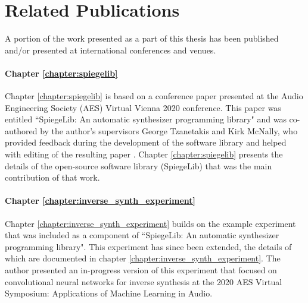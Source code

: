 \newpage
{}

\chapter*{Related Publications}

A portion of the work presented as a part of this thesis has been published and/or presented at international conferences and venues. 

\subsubsection{Chapter \ref{chapter:spiegelib}}
Chapter \ref{chapter:spiegelib} is based on a conference paper presented at the Audio Engineering Society (AES) Virtual Vienna 2020 conference. This paper was entitled ``SpiegeLib: An automatic synthesizer programming library" and was co-authored by the author's supervisors George Tzanetakis and Kirk McNally, who provided feedback during the development of the software library and helped with editing of the resulting paper \cite{shier2020spiegelib}. Chapter \ref{chapter:spiegelib} presents the details of the open-source software library (SpiegeLib) that was the main contribution of that work. 

\subsubsection{Chapter \ref{chapter:inverse_synth_experiment}}
Chapter \ref{chapter:inverse_synth_experiment} builds on the example experiment that was included as a component of ``SpiegeLib: An automatic synthesizer programming library". This experiment has since been extended, the details of which are documented in chapter \ref{chapter:inverse_synth_experiment}. The author presented an in-progress version of this experiment that focused on convolutional neural networks for inverse synthesis at the 2020 AES Virtual Symposium: Applications of Machine Learning in Audio. 

